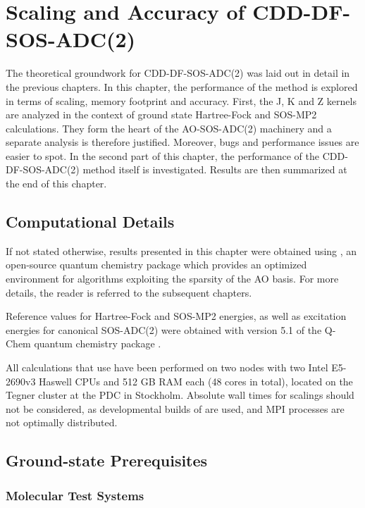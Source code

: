 \chapter{Scaling and Accuracy of CDD-DF-SOS-ADC(2) \label{cha:RESULTS}}

The theoretical groundwork for CDD-DF-SOS-ADC(2) was laid out in detail in the previous chapters. In this chapter, the performance of the method is explored in terms of scaling, memory footprint and accuracy. First, the J, K and Z kernels are analyzed in the context of ground state Hartree-Fock and SOS-MP2 calculations. They form the heart of the AO-SOS-ADC(2) machinery and a separate analysis is therefore justified. Moreover, bugs and performance issues are easier to spot. In the second part of this chapter, the performance of the CDD-DF-SOS-ADC(2) method itself is investigated. Results are then summarized at the end of this chapter. 

\section{Computational Details}

If not stated otherwise, results presented in this chapter were obtained using \mchem{}, an open-source quantum chemistry package which provides an optimized environment for algorithms exploiting the sparsity of the AO basis. For more details, the reader is referred to the subsequent chapters.

Reference values for Hartree-Fock and SOS-MP2 energies, as well as excitation energies for canonical SOS-ADC(2) were obtained with version 5.1 of the Q-Chem quantum chemistry package \cite{Sha2015}.

All calculations that use \mchem{} have been performed on two nodes with two Intel E5-2690v3 Haswell CPUs and 512 GB RAM each (48 cores in total), located on the Tegner cluster at the PDC in Stockholm. Absolute wall times for scalings should not be considered, as developmental builds of \mchem{} are used, and MPI processes are not optimally distributed.  

\section{Ground-state Prerequisites}

\subsection{Molecular Test Systems}

